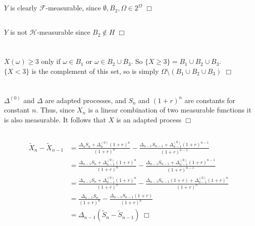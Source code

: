 \documentclass{article}
\begin{document}
\subsection{}
$Y$ is clearly $\mathcal{F}$-measurable, since $\emptyset, B_2, \Omega \in 2^\Omega$ $\Box$

\subsection{}
$Y$ is not $\mathcal{H}$-measurable since $B_2 \notin H$ $\Box$

\section{}
$X(\omega) \geq 3$ only if $\omega \in B_1$ or $\omega \in B_2 \cup B_3$. So $\{X \geq 3\} = B_1 \cup B_2 \cup B_3$.\\
$\{X < 3\}$ is the complement of this set, so is simply $\Omega \setminus (B_1 \cup B_2 \cup B_3)$ $\Box$

\section{}
\subsection{}
$\Delta^{(0)}$ and $\Delta$ are adapted processes, and $S_n$ and $(1+r)^n$ are constants for constant $n$. Thus, since $X_n$ is a linear combination of two measurable functions it is also measurable. It follows that $X$ is an adapted process $\Box$

\subsection{}
\begin{equation*}
\begin{split}
\widetilde{X}_n - \widetilde{X}_{n-1} &= \frac{\Delta_nS_n + \Delta_{n}^{(0)}(1+r)^n}{(1 + r)^n} - \frac{\Delta_{n-1}S_{n-1} + \Delta_{n-1}^{(0)}(1+r)^{n-1}}{(1 + r)^{n-1}}\\
&= \frac{\Delta_{n-1}S_n + \Delta_{n-1}^{(0)}(1+r)^n}{(1 + r)^n} - \frac{\Delta_{n-1}S_{n-1} + \Delta_{n-1}^{(0)}(1+r)^{n-1}}{(1 + r)^{n-1}}\\
&= \frac{\Delta_{n-1}S_n + \Delta_{n-1}^{(0)}(1+r)^n}{(1 + r)^n} - \frac{\Delta_{n-1}S_{n-1}(1+r) + \Delta_{n-1}^{(0)}(1+r)^{n}}{(1 + r)^{n}}\\
&= \frac{\Delta_{n-1}S_n}{(1+r)^n} - \frac{\Delta_{n-1}S_{n-1}(1+r)}{(1+r)^{n}}\\
&= \Delta_{n-1}\left(\widetilde{S}_n - \widetilde{S}_{n-1} \right) \; \Box
\end{split}
\end{equation*}
\end{document}
